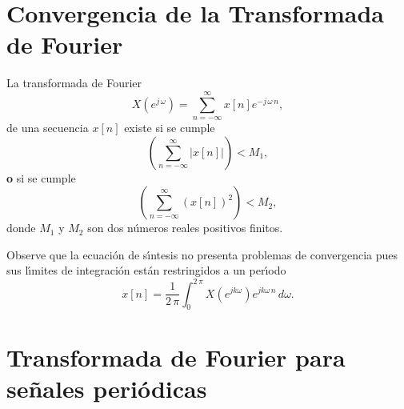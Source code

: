 \section{Convergencia de la Transformada de Fourier}

La transformada de Fourier 
\begin{equation}
  X\left( e^{j \, \omega }\right) =
  \sum_{n=-\infty }^{\infty }x\left[ n\right]e^{-j \, \omega \, n},
\end{equation}
de una secuencia $x\left[ n\right] $ existe si se cumple 
\begin{equation}
\left( \sum_{n=-\infty }^{\infty }\left| x\left[ n\right] \right| \right)
<M_{1},
\end{equation}
\textbf{o} si se cumple 
\begin{equation}
\left( \sum_{n=-\infty }^{\infty }\left( x\left[ n\right] \right)^{2}\right) <M_{2},
\end{equation}
donde $M_{1}$ y $M_{2}$ son dos n\'{u}meros reales positivos finitos.

Observe que la ecuaci\'{o}n de s\'{\i}ntesis no presenta problemas de
convergencia pues sus l\'{\i}mites de integraci\'{o}n est\'{a}n restringidos
a un per\'{\i}odo 
\begin{equation}
x\left[ n\right] =
  \frac{1}{2 \, \pi }\int_{0}^{2 \, \pi }
  X\left( e^{jk\omega}\right) e^{jk\omega \, n}\, d\omega .
\end{equation}

\section{Transformada de Fourier para se\~{n}ales peri\'{o}dicas}

